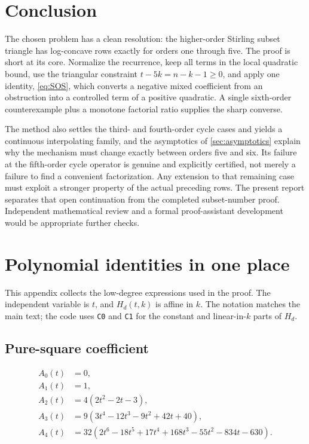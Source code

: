 \documentclass[11pt,a4paper]{article}
\numberwithin{equation}{section}
\theoremstyle{definition}
\theoremstyle{remark}
\begin{document}
\section{Conclusion}\label{sec:conclusion}

The chosen problem has a clean resolution: the higher-order Stirling
subset triangle has log-concave rows exactly for orders one through five.
The proof is short at its core. Normalize the recurrence, keep all terms
in the local quadratic bound, use the triangular constraint
$t-5k=n-k-1\ge0$, and apply one identity, \eqref{eq:SOS}, which converts a
negative mixed coefficient from an obstruction into a controlled term of a
positive quadratic. A single sixth-order counterexample plus a monotone
factorial ratio supplies the sharp converse.

The method also settles the third- and fourth-order cycle cases and yields
a continuous interpolating family, and the asymptotics of
\cref{sec:asymptotics} explain why the mechanism must change exactly
between orders five and six. Its failure at the fifth-order cycle
operator is genuine and explicitly certified, not merely a failure to
find a convenient factorization. Any extension to that remaining case
must exploit a stronger property of the actual preceding rows. The
present report separates that open continuation from the completed
subset-number proof. Independent mathematical review and a formal
proof-assistant development would be appropriate further checks.

\appendix
\section{Polynomial identities in one place}\label{sec:polynomial-table}

This appendix collects the low-degree expressions used in the proof.
The independent variable is $t$, and $H_d(t,k)$ is affine in $k$.
The notation matches the main text; the code uses \texttt{C0} and
\texttt{C1} for the constant and linear-in-$k$ parts of $H_d$.

\subsection{Pure-square coefficient}
\begin{align*}
 A_0(t)&=0,\\
 A_1(t)&=1,\\
 A_2(t)&=4(2t^2-2t-3),\\
 A_3(t)&=9(3t^4-12t^3-9t^2+42t+40),\\
 A_4(t)&=32(2t^6-18t^5+17t^4+168t^3-55t^2-834t-630).
\end{align*}
\end{document}
